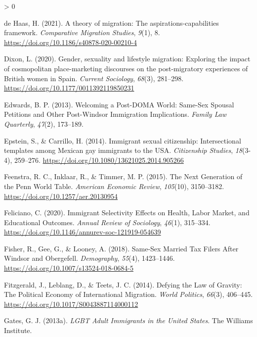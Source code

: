 \documentclass[
  11pt,
]{article}
\newlength{\cslhangindent}
\newenvironment{CSLReferences}[2] %
 {%
  \setlength{\parindent}{0pt}
  \ifodd #1 \everypar{\setlength{\hangindent}{\cslhangindent}}\ignorespaces\fi
  \ifnum #2 > 0
  \setlength{\parskip}{#2\baselineskip}
  \fi
 }%
 {}
\begin{document}
\begin{CSLReferences}{1}{0}
\leavevmode\hypertarget{ref-dehaas_2021}{}%
de Haas, H. (2021). A theory of migration: The aspirations-capabilities framework. \emph{Comparative Migration Studies}, \emph{9}(1), 8. \url{https://doi.org/10.1186/s40878-020-00210-4}

\leavevmode\hypertarget{ref-dixon_2020}{}%
Dixon, L. (2020). Gender, sexuality and lifestyle migration: {Exploring} the impact of cosmopolitan place-marketing discourses on the post-migratory experiences of {British} women in {Spain}. \emph{Current Sociology}, \emph{68}(3), 281--298. \url{https://doi.org/10.1177/0011392119850231}

\leavevmode\hypertarget{ref-edwards_2013}{}%
Edwards, B. P. (2013). Welcoming a {Post}-{DOMA World}: {Same}-{Sex Spousal Petitions} and {Other Post}-{Windsor Immigration Implications}. \emph{Family Law Quarterly}, \emph{47}(2), 173--189.

\leavevmode\hypertarget{ref-epstein_2014}{}%
Epstein, S., \& Carrillo, H. (2014). Immigrant sexual citizenship: Intersectional templates among {Mexican} gay immigrants to the {USA}. \emph{Citizenship Studies}, \emph{18}(3-4), 259--276. \url{https://doi.org/10.1080/13621025.2014.905266}

\leavevmode\hypertarget{ref-feenstra_2015}{}%
Feenstra, R. C., Inklaar, R., \& Timmer, M. P. (2015). The {Next Generation} of the {Penn World Table}. \emph{American Economic Review}, \emph{105}(10), 3150--3182. \url{https://doi.org/10.1257/aer.20130954}

\leavevmode\hypertarget{ref-feliciano_2020}{}%
Feliciano, C. (2020). Immigrant {Selectivity Effects} on {Health}, {Labor Market}, and {Educational Outcomes}. \emph{Annual Review of Sociology}, \emph{46}(1), 315--334. \url{https://doi.org/10.1146/annurev-soc-121919-054639}

\leavevmode\hypertarget{ref-fisher_2018}{}%
Fisher, R., Gee, G., \& Looney, A. (2018). Same-{Sex Married Tax Filers After Windsor} and {Obergefell}. \emph{Demography}, \emph{55}(4), 1423--1446. \url{https://doi.org/10.1007/s13524-018-0684-5}

\leavevmode\hypertarget{ref-fitzgerald_2014}{}%
Fitzgerald, J., Leblang, D., \& Teets, J. C. (2014). Defying the {Law} of {Gravity}: {The Political Economy} of {International Migration}. \emph{World Politics}, \emph{66}(3), 406--445. \url{https://doi.org/10.1017/S0043887114000112}

\leavevmode\hypertarget{ref-gates_2013}{}%
Gates, G. J. (2013a). \emph{{LGBT Adult Immigrants} in the {United States}}. {The Williams Institute}.


\end{CSLReferences}
\end{document}
